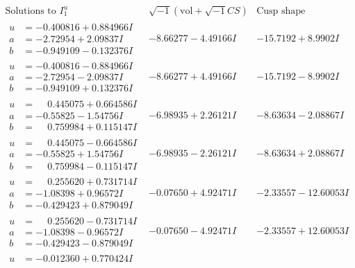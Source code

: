 \documentclass[1p]{elsarticle_modified}
\theoremstyle{definition}
\newcommand{\I}{\sqrt{-1}}
\begin{document}
$$\begin{array}{c|c|c}  
\text{Solutions to }I^u_{1}& \I (\text{vol} + \sqrt{-1}CS) & \text{Cusp shape}\\
 \hline 
\begin{aligned}
u &= -0.400816 + 0.884966 I \\
a &= -2.72954 + 2.09837 I \\
b &= -0.949109 - 0.132376 I\end{aligned}
 & -8.66277 - 4.49166 I & -15.7192 + 8.9902 I \\ \hline\begin{aligned}
u &= -0.400816 - 0.884966 I \\
a &= -2.72954 - 2.09837 I \\
b &= -0.949109 + 0.132376 I\end{aligned}
 & -8.66277 + 4.49166 I & -15.7192 - 8.9902 I \\ \hline\begin{aligned}
u &= \phantom{-}0.445075 + 0.664586 I \\
a &= -0.55825 - 1.54756 I \\
b &= \phantom{-}0.759984 + 0.115147 I\end{aligned}
 & -6.98935 + 2.26121 I & -8.63634 - 2.08867 I \\ \hline\begin{aligned}
u &= \phantom{-}0.445075 - 0.664586 I \\
a &= -0.55825 + 1.54756 I \\
b &= \phantom{-}0.759984 - 0.115147 I\end{aligned}
 & -6.98935 - 2.26121 I & -8.63634 + 2.08867 I \\ \hline\begin{aligned}
u &= \phantom{-}0.255620 + 0.731714 I \\
a &= -1.08398 + 0.96572 I \\
b &= -0.429423 + 0.879049 I\end{aligned}
 & -0.07650 + 4.92471 I & -2.33557 - 12.60053 I \\ \hline\begin{aligned}
u &= \phantom{-}0.255620 - 0.731714 I \\
a &= -1.08398 - 0.96572 I \\
b &= -0.429423 - 0.879049 I\end{aligned}
 & -0.07650 - 4.92471 I & -2.33557 + 12.60053 I \\ \hline\begin{aligned}
u &= -0.012360 + 0.770424 I \\

\end{aligned}
\end{array}$$
\end{document}
